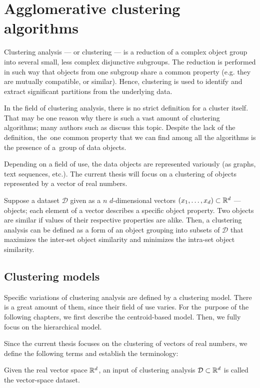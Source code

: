 \chapter{Agglomerative clustering algorithms}

Clustering analysis --- or clustering --- is a reduction of a complex object group into several small, less complex disjunctive subgroups. The reduction is performed in such way that objects from one subgroup share a common property (e.g. they are mutually compatible, or similar). Hence, clustering is used to identify and extract significant partitions from the underlying data. 

In the field of clustering analysis, there is no strict definition for a cluster itself. That may be one reason why there is such a vast amount of clustering algorithms; many authors such as \citet{estivill2002so} discuss this topic.  Despite the lack of the definition, the~one common property that we can find among all the algorithms is the presence of a~group of data objects.

Depending on a field of use, the data objects are represented variously (as graphs, text sequences, etc.). The current thesis will focus on a clustering of objects represented by a vector of real numbers.

Suppose a dataset $\mathcal{D}$ given as a $n$ $d$-dimensional vectors $(x_1,\dots,x_d) \subset \mathbb{R}^d$  --- objects; each element of a vector describes a specific object property. Two objects are similar if values of their respective properties are alike. Then, a clustering analysis can be defined as a form of an object grouping into subsets of $\mathcal{D}$ that maximizes the inter-set object similarity and minimizes the intra-set object similarity.

\section{Clustering models}

Specific variations of clustering analysis are defined by a clustering model. There is a great amount of them, since their field of use varies. For the~purpose of the following chapters, we first describe the centroid-based model. Then, we fully focus on the hierarchical model. 

Since the current thesis focuses on the clustering of vectors of real numbers, we define the following terms and establish the terminology:

\begin{defn}
	Given the real vector space $\mathbb{R}^d$, an input of clustering analysis $\mathcal{D}\subset\mathbb{R}^d$ is called the vector-space dataset.
\end{defn}


